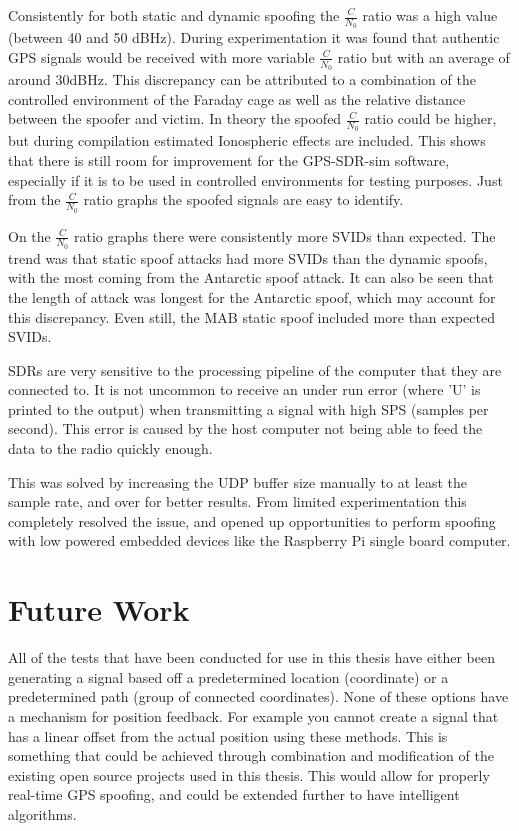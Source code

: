 Consistently for both static and dynamic spoofing the $\frac{C}{N_0}$ ratio was a high value (between 40 and 50 dBHz). During experimentation it was found that authentic
GPS signals would be received with more variable $\frac{C}{N_0}$ ratio but with an average of around 30dBHz. This discrepancy can be attributed to a combination of the
controlled environment of the Faraday cage as well as the relative distance between the spoofer and victim. In theory the spoofed $\frac{C}{N_0}$ ratio could be higher,
but during compilation estimated Ionospheric effects are included. This shows that there is still room for improvement for the GPS-SDR-sim software, especially if it is
to be used in controlled environments for testing purposes. Just from the $\frac{C}{N_0}$ ratio graphs the spoofed signals are easy to identify.

On the $\frac{C}{N_0}$ ratio graphs there were consistently more SVIDs than expected. The trend was that static spoof attacks had more SVIDs than the dynamic spoofs, with
the most coming from the Antarctic spoof attack. It can also be seen that the length of attack was longest for the Antarctic spoof, which may account for this
discrepancy. Even still, the MAB static spoof included more than expected SVIDs.

SDRs are very sensitive to the processing pipeline of the computer that they are connected to. It is not uncommon to receive an under run error (where 'U' is printed to the
output) when transmitting a signal with high SPS (samples per second). This error is caused by the host computer not being able to feed the data to the radio quickly
enough.

This was solved by increasing the UDP buffer size manually to at least the sample rate, and over for better results. From limited experimentation this completely resolved the issue, and opened up
opportunities to perform spoofing with low powered embedded devices like the Raspberry Pi single board computer.

\section{Future Work}
All of the tests that have been conducted for use in this thesis have either been generating a signal based off a predetermined location (coordinate) or a predetermined
path (group of connected coordinates). None of these options have a mechanism for position feedback. For example you cannot create a signal that has a linear offset from
the actual position using these methods. This is something that could be achieved through combination and modification of the existing open source projects used in this
thesis. This would allow for properly real-time GPS spoofing, and could be extended further to have intelligent algorithms.

